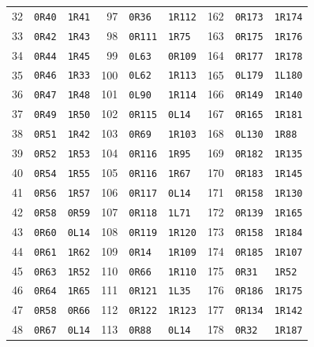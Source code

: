{\begin{longtable}{@{}rll@{\hspace{1.8em}}rll@{\hspace{1.8em}}rll@{}}
32 & \texttt{0R40} & \texttt{1R41} & 97 & \texttt{0R36} & \texttt{1R112} & 162 & \texttt{0R173} & \texttt{1R174}\\
33 & \texttt{0R42} & \texttt{1R43} & 98 & \texttt{0R111} & \texttt{1R75} & 163 & \texttt{0R175} & \texttt{1R176}\\
34 & \texttt{0R44} & \texttt{1R45} & 99 & \texttt{0L63} & \texttt{0R109} & 164 & \texttt{0R177} & \texttt{1R178}\\
35 & \texttt{0R46} & \texttt{1R33} & 100 & \texttt{0L62} & \texttt{1R113} & 165 & \texttt{0L179} & \texttt{1L180}\\
36 & \texttt{0R47} & \texttt{1R48} & 101 & \texttt{0L90} & \texttt{1R114} & 166 & \texttt{0R149} & \texttt{1R140}\\
37 & \texttt{0R49} & \texttt{1R50} & 102 & \texttt{0R115} & \texttt{0L14} & 167 & \texttt{0R165} & \texttt{1R181}\\
38 & \texttt{0R51} & \texttt{1R42} & 103 & \texttt{0R69} & \texttt{1R103} & 168 & \texttt{0L130} & \texttt{1R88}\\
39 & \texttt{0R52} & \texttt{1R53} & 104 & \texttt{0R116} & \texttt{1R95} & 169 & \texttt{0R182} & \texttt{1R135}\\
40 & \texttt{0R54} & \texttt{1R55} & 105 & \texttt{0R116} & \texttt{1R67} & 170 & \texttt{0R183} & \texttt{1R145}\\
41 & \texttt{0R56} & \texttt{1R57} & 106 & \texttt{0R117} & \texttt{0L14} & 171 & \texttt{0R158} & \texttt{1R130}\\
42 & \texttt{0R58} & \texttt{0R59} & 107 & \texttt{0R118} & \texttt{1L71} & 172 & \texttt{0R139} & \texttt{1R165}\\
43 & \texttt{0R60} & \texttt{0L14} & 108 & \texttt{0R119} & \texttt{1R120} & 173 & \texttt{0R158} & \texttt{1R184}\\
44 & \texttt{0R61} & \texttt{1R62} & 109 & \texttt{0R14} & \texttt{1R109} & 174 & \texttt{0R185} & \texttt{1R107}\\
45 & \texttt{0R63} & \texttt{1R52} & 110 & \texttt{0R66} & \texttt{1R110} & 175 & \texttt{0R31} & \texttt{1R52}\\
46 & \texttt{0R64} & \texttt{1R65} & 111 & \texttt{0R121} & \texttt{1L35} & 176 & \texttt{0R186} & \texttt{1R175}\\
47 & \texttt{0R58} & \texttt{0R66} & 112 & \texttt{0R122} & \texttt{1R123} & 177 & \texttt{0R134} & \texttt{1R142}\\
48 & \texttt{0R67} & \texttt{0L14} & 113 & \texttt{0R88} & \texttt{0L14} & 178 & \texttt{0R32} & \texttt{1R187}\\

\end{longtable}}

